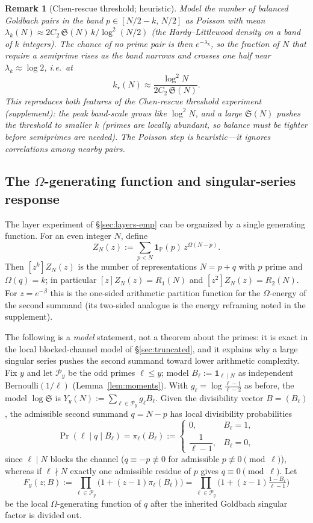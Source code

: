 \documentclass[]{interact}%
\newtheorem{remark}{Remark}
\newcommand{\PP}{\mathbb P}
\newcommand{\ones}{\mathbf 1}
\newcommand{\OmegaF}{\Omega}
\newcommand{\sing}{\mathfrak S}
\begin{document}
\begin{remark}[Chen-rescue threshold; heuristic]
Model the number of balanced Goldbach pairs in the band $p\in[N/2-k,\,N/2]$ as Poisson with
mean $\lambda_k(N)\approx 2C_2\,\sing(N)\,k/\log^2(N/2)$ (the Hardy--Littlewood density on a
band of $k$ integers). The chance of no prime pair is then $e^{-\lambda_k}$, so the fraction
of $N$ that require a semiprime rises as the band narrows and crosses one half near
$\lambda_k\approx\log2$, i.e.\ at
\[
  k_\star(N)\approx\frac{\log^2N}{2C_2\,\sing(N)}.
\]
This reproduces both features of the Chen-rescue threshold experiment (supplement): the peak
band-scale grows like $\log^2N$, and a large $\sing(N)$ pushes the threshold to \emph{smaller} $k$ (primes are
locally abundant, so balance must be tighter before semiprimes are needed). The Poisson step
is heuristic---it ignores correlations among nearby pairs.
\end{remark}

\subsection{The \texorpdfstring{$\Omega$}{Omega}-generating function and singular-series response}
\label{sec:omega-gf}

The layer experiment of \S\ref{sec:layers-emp} can be organized by a single generating
function. For an even integer $N$, define
\[
  Z_N(z):=\sum_{p<N}\ones_{\PP}(p)\,z^{\OmegaF(N-p)} .
\]
Then $[z^k]Z_N(z)$ is the number of representations $N=p+q$ with $p$ prime and
$\OmegaF(q)=k$; in particular $[z]Z_N(z)=R_1(N)$ and $[z^2]Z_N(z)=R_2(N)$. For $z=e^{-\beta}$
this is the one-sided arithmetic partition function for the $\OmegaF$-energy of the second
summand (its two-sided analogue is the energy reframing noted in the supplement).

The following is a \emph{model} statement, not a theorem about the primes: it is exact in the
local blocked-channel model of \S\ref{sec:truncated}, and it explains why a large singular
series pushes the second summand toward lower arithmetic complexity. Fix $y$ and let
$\mathcal P_y$ be the odd primes $\ell\le y$; model $B_\ell:=\ones_{\ell\mid N}$ as
independent Bernoulli$(1/\ell)$ (Lemma~\ref{lem:moments}). With $g_\ell=\log\frac{\ell-1}{\ell-2}$
as before, the model $\log\sing$ is $Y_y(N):=\sum_{\ell\in\mathcal P_y}g_\ell B_\ell$. Given
the divisibility vector $B=(B_\ell)$, the admissible second summand $q=N-p$ has local
divisibility probabilities
\[
  \Pr(\ell\mid q\mid B_\ell)=\pi_\ell(B_\ell):=
  \begin{cases}0,&B_\ell=1,\\[1mm]\dfrac1{\ell-1},&B_\ell=0,\end{cases}
\]
since $\ell\mid N$ blocks the channel ($q\equiv-p\not\equiv0$ for admissible
$p\not\equiv0\pmod\ell$), whereas if $\ell\nmid N$ exactly one admissible residue of $p$
gives $q\equiv0\pmod\ell$. Let
\[
  F_y(z;B):=\prod_{\ell\in\mathcal P_y}\big(1+(z-1)\pi_\ell(B_\ell)\big)
  =\prod_{\ell\in\mathcal P_y}\Big(1+(z-1)\tfrac{1-B_\ell}{\ell-1}\Big)
\]
be the local $\OmegaF$-generating function of $q$ after the inherited Goldbach singular
factor is divided out.
\end{document}
